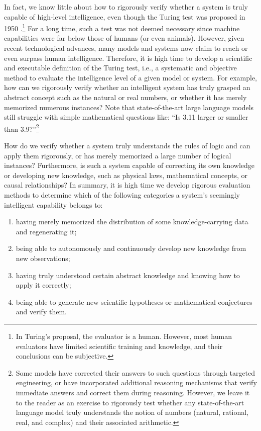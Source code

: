 \documentclass[../../book-main.tex]{subfiles}
\begin{document}
In fact, we know little about how to rigorously verify whether a system is truly capable of high-level intelligence, even though the Turing test was proposed in 1950 \cite{Turing-1950}.\footnote{In Turing's proposal, the evaluator is a human. However, most human evaluators have limited scientific training and knowledge, and their conclusions can be subjective.} For a long time, such a test was not deemed necessary since machine capabilities were far below those of humans (or even animals). However, given recent technological advances, many models and systems now claim to reach or even surpass human intelligence. Therefore, it is high time to develop a scientific and executable definition of the Turing test, i.e., a systematic and objective method to evaluate the intelligence level of a given model or system. For example, how can we rigorously verify whether an intelligent system has truly grasped an abstract concept such as the natural or real numbers, or whether it has merely memorized numerous instances? Note that state-of-the-art large language models still struggle with simple mathematical questions like: ``Is 3.11 larger or smaller than 3.9?''\footnote{Some models have corrected their answers to such questions through targeted engineering, or have incorporated additional reasoning mechanisms that verify immediate answers and correct them during reasoning. However, we leave it to the reader as an exercise to rigorously test whether any state-of-the-art language model truly understands the notion of numbers (natural, rational, real, and complex) and their associated arithmetic.}

How do we verify whether a system truly understands the rules of logic and can apply them rigorously, or has merely memorized a large number of logical instances? Furthermore, is such a system capable of correcting its own knowledge or developing new knowledge, such as physical laws, mathematical concepts, or causal relationships? In summary, it is high time we develop rigorous evaluation methods to determine which of the following categories a system's seemingly intelligent capability belongs to:
\begin{enumerate}
    \item having merely memorized the distribution of some knowledge-carrying data and regenerating it;
    \item being able to autonomously and continuously develop new knowledge from new observations;
    \item having truly understood certain abstract knowledge and knowing how to apply it correctly;
    \item being able to generate new scientific hypotheses or mathematical conjectures and verify them.
\end{enumerate}
\end{document}
